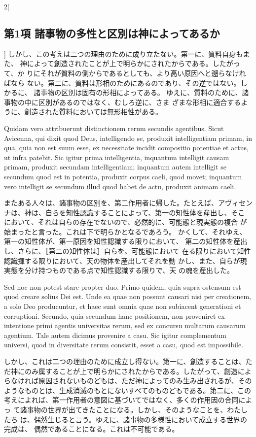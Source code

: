 \documentclass[paper=a4paper,fontsize=10pt,jafontsize=9pt,titlepage]{jlreq}
\begin{document}
\begin{paracol}{2}[\subsection{第1項 諸事物の多性と区別は神によってあるか}]
しかし、この考えは二つの理由のために成り立たない。第一に、質料自身もまた、
 神によって創造されたことが上で明らかにされたからである。したがって、か
 りにそれが質料の側からであるとしても、より高い原因へと遡らなければなら
 ない。第二に、質料は形相のためにあるのであり、その逆ではない。しかるに、
 諸事物の区別は固有の形相によってある。
ゆえに、質料のために、諸事物の中に区別があるのではなく、むしろ逆に、さま
 ざまな形相に適合するように、創造された質料においては無形相性がある。


\switchcolumn*


Quidam vero attribuerunt distinctionem rerum secundis
 agentibus. Sicut Avicenna, qui dixit quod Deus, intelligendo se,
 produxit intelligentiam primam, in qua, quia non est suum esse, ex
 necessitate incidit compositio potentiae et actus, ut infra
 patebit. Sic igitur prima intelligentia, inquantum intelligit causam
 primam, produxit secundam intelligentiam; inquantum autem intelligit se
 secundum quod est in potentia, produxit corpus caeli, quod movet;
 inquantum vero intelligit se secundum illud quod habet de actu,
 produxit animam caeli.


\switchcolumn


またある人々は、諸事物の区別を、第二作用者に帰した。たとえば、アヴィセン
 ナは、神は、自らを知性認識することによって、第一の知性体を産出し、そこ
 において、それは自らの存在でないので、必然的に、可能態と現実態の複合
 が始まったと言った。これは下で明らかとなるであろう。
かくして、それゆえ、第一の知性体が、第一原因を知性認識する限りにおいて、
 第二の知性体を産出し、さらに、［第二の知性体は］自らを、可能態において
 在る限りにおいて知性認識揮する限りにおいて、天の物体を産出してそれを動
 かし、また、自らが現実態を分け持つものである点で知性認識する限りで、天
 の魂を産出した。


\switchcolumn*


Sed hoc non potest stare propter duo. Primo
 quidem, quia supra ostensum est quod creare solius Dei est. Unde ea
 quae non possunt causari nisi per creationem, a solo Deo producuntur,
 et haec sunt omnia quae non subiacent generationi et
 corruptioni. Secundo, quia secundum hanc positionem, non proveniret ex
 intentione primi agentis universitas rerum, sed ex concursu multarum
 causarum agentium. Tale autem dicimus provenire a casu. Sic igitur
 complementum universi, quod in diversitate rerum consistit, esset a
 casu, quod est impossibile.


\switchcolumn


しかし、これは二つの理由のために成立し得ない。第一に、創造することは、た
だ神にのみ属することが上で明らかにされたからである。したがって、創造によ
らなければ原因されないものどもは、ただ神によってのみ生み出されるが、その
ようなものとは、生成消滅のもとにないすべてのものどもである。第二に、この
考えによれば、第一作用者の意図に基づいてではなく、多くの作用因の合同によっ
て諸事物の世界が出てきたことになる。しかし、そのようなことを、わたしたち
は、偶然生じると言う。ゆえに、諸事物の多様性において成立する世界の完成は、
偶然であることになる。これは不可能である。



\end{paracol}
\end{document}
